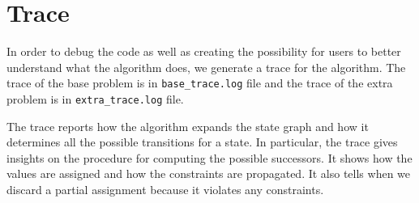 \documentclass[a4paper]{article}
\begin{document}
\section{Trace}
In order to debug the code as well as creating the possibility for users to better understand what the algorithm does, we generate a trace for the algorithm. The trace of the base problem is in \texttt{base\_trace.log} file and the trace of the extra problem is in \texttt{extra\_trace.log} file.

The trace reports how the algorithm expands the state graph and how it determines all the possible transitions for a state. In particular, the trace gives insights on the procedure for computing the possible successors. It shows how the values are assigned and how the constraints are propagated. It also tells when we discard a partial assignment because it violates any constraints.
\end{document}
